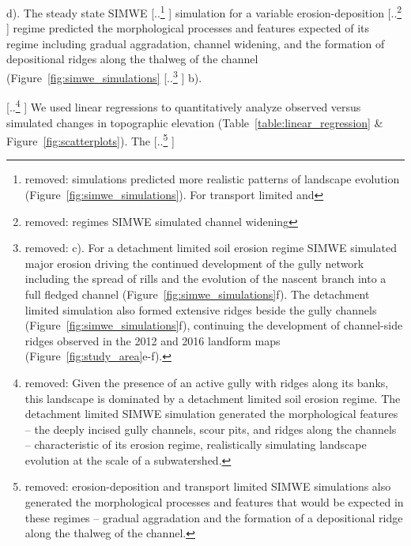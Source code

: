 \documentclass[gmd, manuscript]{copernicus}
\providecommand{\DIFadd}[1]{{\protect\color{blue} \sf #1}} %
\providecommand{\DIFdel}[1]{{\protect\color{red} [..\footnote{removed: #1} ]}} %
\providecommand{\DIFaddbegin}{} %
\providecommand{\DIFaddend}{} %
\providecommand{\DIFdelbegin}{} %
\providecommand{\DIFdelend}{} %
\begin{document}
\DIFdelend \DIFaddbegin \DIFadd{d). 
}\DIFaddend The steady state SIMWE \DIFdelbegin \DIFdel{simulations 
predicted more realistic patterns 
of landscape evolution
(Figure~\ref{fig:simwe_simulations}). 
For transport limited and
}\DIFdelend \DIFaddbegin \DIFadd{simulation
for a }\DIFaddend variable erosion-deposition \DIFdelbegin \DIFdel{regimes
SIMWE simulated
channel widening}\DIFdelend \DIFaddbegin \DIFadd{regime
predicted the morphological processes and features
expected of its regime including
gradual aggradation,
channel widening,
}\DIFaddend and the formation of depositional ridges
along the thalweg of the channel
(Figure~\ref{fig:simwe_simulations}\DIFdelbegin \DIFdel{c).
For a detachment limited soil erosion regime
SIMWE simulated major erosion
driving the continued development 
of the gully network
including the spread of rills and
the evolution of the nascent branch
into a full fledged channel
(Figure~\ref{fig:simwe_simulations}f).
The detachment limited simulation
also formed extensive ridges
beside the gully channels 
(Figure~\ref{fig:simwe_simulations}f), 
continuing the development of channel-side ridges
observed in the 2012 and 2016 landform maps
(Figure~\ref{fig:study_area}e-f). 
}\DIFdelend \DIFaddbegin \DIFadd{b).
}\DIFaddend 

\DIFdelbegin \DIFdel{Given the presence of an active gully 
with ridges along its banks,
this landscape is dominated by 
a detachment limited soil erosion regime.
The detachment limited SIMWE simulation generated the morphological features
-- the deeply incised gully channels, 
scour pits,
and ridges along the channels 
--
characteristic of its erosion regime,
realistically simulating landscape evolution 
at the scale of a subwatershed. 
}\DIFdelend %
\DIFaddbegin \DIFadd{We used linear regressions to quantitatively analyze 
observed versus simulated changes in topographic elevation
(Table~\ref{table:linear_regression} \& Figure~\ref{fig:scatterplots}).
}\DIFaddend The \DIFdelbegin \DIFdel{erosion-deposition and 
transport limited 
SIMWE simulations also generated 
the morphological processes and features
that would be expected in these regimes
-- gradual aggradation
and the formation of a depositional ridge 
along the thalweg of the channel.
}%
\end{document}
